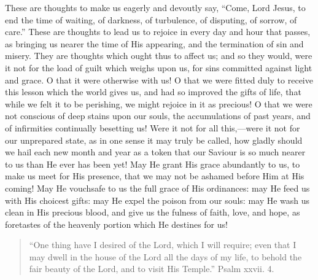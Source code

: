 These are thoughts to make us eagerly and devoutly say, ``Come,
Lord Jesus, to end the time of waiting, of darkness, of turbulence, of
disputing, of sorrow, of care.'' These are thoughts to lead us to
rejoice in every day and hour that passes, as bringing us nearer the
time of His appearing, and the termination of sin and misery. They are
thoughts which ought thus to affect us; and so they would, were it not
for the load of guilt which weighs upon us, for sins committed against
light and grace. O that it were otherwise with us! O that we were
fitted duly to receive this lesson which the world gives us, and had
so improved the gifts of life, that while we felt it to be perishing,
we might rejoice in it as precious! O that we were not conscious of
deep stains upon our souls, the accumulations of past years, and of
infirmities continually besetting us! Were it not for all this,—were
it not for our unprepared state, as in one sense it may truly be
called, how gladly should we hail each new month and year as a token
that our Saviour is so much nearer to us than He ever has been yet!
May He grant His grace abundantly to us, to make us meet for His
presence, that we may not be ashamed before Him at His coming! May He
vouchsafe to us the full grace of His ordinances: may He feed us with
His choicest gifts: may He expel the poison from our souls: may He
wash us clean in His precious blood, and give us the fulness of faith,
love, and hope, as foretastes of the heavenly portion which He
destines for us!


\begin{quote}

``One thing have I desired of the Lord, which I will require;
even that I may dwell in the house of the Lord all the days of my
life, to behold the fair beauty of the Lord, and to visit His
Temple.'' Psalm xxvii. 4.

\end{quote}

